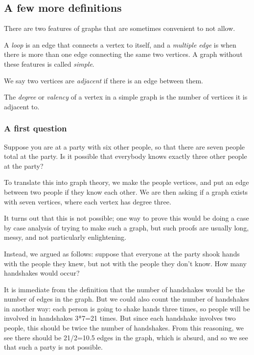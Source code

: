 \documentclass[]{article}
\begin{document}
\subsection{A few more definitions}\label{a-few-more-definitions}

There are two features of graphs that are sometimes convenient to not
allow.

A \emph{loop} is an edge that connects a vertex to itself, and a
\emph{multiple edge} is when there is more than one edge connecting the
same two vertices. A graph without these features is called
\emph{simple}.

We say two vertices are \emph{adjacent} if there is an edge between
them.

The \emph{degree} or \emph{valency} of a vertex in a simple graph is the
number of vertices it is adjacent to.

\subsubsection{A first question}\label{a-first-question}

Suppose you are at a party with six other people, so that there are
seven people total at the party. Is it possible that everybody knows
exactly three other people at the party?

To translate this into graph theory, we make the people vertices, and
put an edge between two people if they know each other. We are then
asking if a graph exists with seven vertices, where each vertex has
degree three.

It turns out that this is not possible; one way to prove this would be
doing a case by case analysis of trying to make such a graph, but such
proofs are usually long, messy, and not particularly enlightening.

Instead, we argued as follows: suppose that everyone at the party shook
hands with the people they knew, but not with the people they don't
know. How many handshakes would occur?

It is immediate from the definition that the number of handshakes would
be the number of edges in the graph. But we could also count the number
of handshakes in another way: each person is going to shake hands three
times, so people will be involved in handshakes 3*7=21 times. But since
each handshake involves two people, this should be twice the number of
handshakes. From this reasoning, we see there should be 21/2=10.5 edges
in the graph, which is absurd, and so we see that such a party is not
possible.
\end{document}
